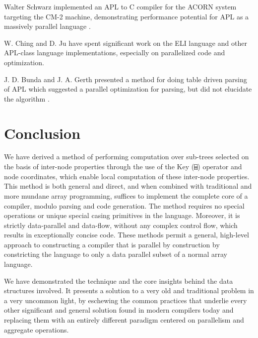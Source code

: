 \documentclass[numbers,preprint]{sigplanconf}
\begin{document}
Walter Schwarz implemented an APL to C compiler for the ACORN system
targeting the CM-2 machine, demonstrating performance potential for
APL as a massively parallel language \cite{schwarz1991acorn}.

W. Ching and D. Ju have spent significant work on the ELI language
and other APL-class language
 implementations, especially on parallelized code and optimization. 
\cite{ching2000design,ching1994experimental,ching1993primitive,
ching1990automatic,hendriks1990sparse,ju1991exploitation,
ju1991performance}

J. D. Bunda and J. A. Gerth presented a method for doing table driven
parsing of APL which suggested a parallel optimization for parsing,
but did not elucidate the algorithm \cite{bunda1984apl}.

\section{Conclusion}

We have derived a method of performing computation over sub-trees
selected on the basis of inter-node properties through the use of the
Key (\verb;⌸;) operator and node coordinates, which enable local computation
of these inter-node properties. This method is both general and direct,
and when combined with traditional and more mundane array programming,
suffices to implement the complete core of a compiler, modulo parsing
and code generation. The method requires no special operations or
unique special casing primitives in the language. Moreover, it is
strictly data-parallel and data-flow, without any complex control flow,
which results in exceptionally concise code. These methods permit a 
general, high-level approach to constructing a compiler that is 
parallel by construction by constricting the language to only a data parallel 
subset of a normal array language. 

We have demonstrated the technique and the core insights behind the
data structures involved. It presents a solution to a very old and
traditional problem in a very uncommon light, by eschewing the common
practices that underlie every other significant and general solution
found in modern compilers today and replacing them with an entirely
different paradigm centered on parallelism and aggregate operations.



\end{document}
